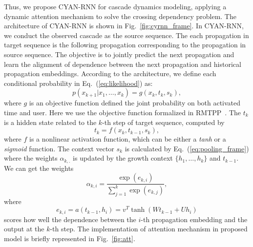 Thus, we propose CYAN-RNN for cascade dynamics modeling, applying a dynamic
attention mechanism to solve the crossing dependency problem. The architecture
of CYAN-RNN is shown in Fig.~\ref{fig:cyrnn_frame}. In CYAN-RNN, we conduct the
observed cascade as the source sequence. The each propagation in target sequence
is the following propagation corresponding to the propagation in source
sequence. 
The objective is to
jointly predict the next propagation and learn the alignment of dependence
between the next propagation and historical propagation embeddings. 
According to the architecture, we define each conditional probability in
Eq.~(\ref{eq:likelihood}) as:
\begin{equation}
\label{eq:cond_prob}
p(x_{k+1}|x_1,\ldots,x_k)=g(x_k, t_{k}, s_{k}),
\end{equation}
where $g$ is an objective function defined the joint probability
on both activated time and user. Here we use the objective function
formalized in RMTPP~\cite{DuKDD2016}.
The $t_k$ is a hidden state related
to the $k$-th step of target sequence, computed by
\begin{equation}
\label{eq:target_embedding}
t_k = f(x_k, t_{k-1}, s_k),
\end{equation}
where 
$f$ is
a nonlinear activation function, which can be either a \textit{tanh} or
a \textit{sigmoid} function. The context vector $s_k$ is calculated by
Eq.~(\ref{eq:pooling_frame}) where the weights $\alpha_{k,.}$ 
is updated by the growth context
$\{h_1,\ldots,h_k\}$ and $t_{k-1}$. We can get the weights
\begin{equation}
\label{eq:alpha}
\alpha_{k,i}=\frac{\exp(e_{k,i})}{\sum_{j=1}^k \exp(e_{k,j})},
\end{equation}
where
\begin{equation}
\label{eq:score}
e_{k,i}=a(t_{k-1}, h_i)=v^T\tanh(W t_{k-1}+U h_i)
\end{equation}
scores how well the dependence between the $i$-th propagation
embedding and the output at the $k$-th step. The implementation of attention
mechanism in proposed model is briefly represented in Fig.~\ref{fig:att}. 

